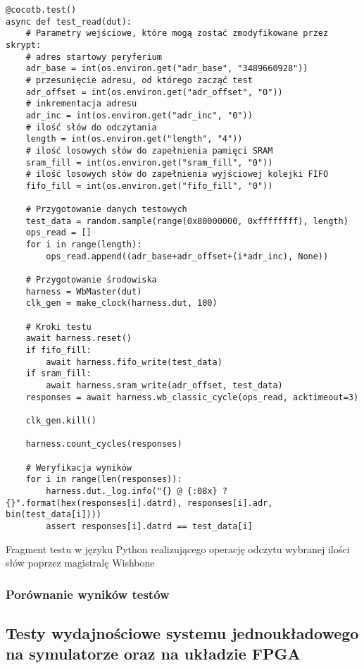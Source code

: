 \begin{longlisting}
\begin{verbatim}
@cocotb.test()
async def test_read(dut):
    # Parametry wejściowe, które mogą zostać zmodyfikowane przez skrypt:
    # adres startowy peryferium
    adr_base = int(os.environ.get("adr_base", "3489660928"))
    # przesunięcie adresu, od którego zacząć test
    adr_offset = int(os.environ.get("adr_offset", "0"))
    # inkrementacja adresu
    adr_inc = int(os.environ.get("adr_inc", "0"))
    # ilość słów do odczytania
    length = int(os.environ.get("length", "4"))
    # ilość losowych słów do zapełnienia pamięci SRAM
    sram_fill = int(os.environ.get("sram_fill", "0"))
    # ilość losowych słów do zapełnienia wyjściowej kolejki FIFO
    fifo_fill = int(os.environ.get("fifo_fill", "0"))

    # Przygotowanie danych testowych
    test_data = random.sample(range(0x80000000, 0xffffffff), length)
    ops_read = []
    for i in range(length):
        ops_read.append((adr_base+adr_offset+(i*adr_inc), None))

    # Przygotowanie środowiska
    harness = WbMaster(dut)
    clk_gen = make_clock(harness.dut, 100)

    # Kroki testu
    await harness.reset()
    if fifo_fill:
        await harness.fifo_write(test_data)
    if sram_fill:
        await harness.sram_write(adr_offset, test_data)
    responses = await harness.wb_classic_cycle(ops_read, acktimeout=3)

    clk_gen.kill()

    harness.count_cycles(responses)

    # Weryfikacja wyników
    for i in range(len(responses)):
        harness.dut._log.info("{} @ {:08x} ? {}".format(hex(responses[i].datrd), responses[i].adr, bin(test_data[i])))
        assert responses[i].datrd == test_data[i]
\end{verbatim}
\caption{\label{lst:harness-sampletest}Fragment testu w języku Python realizującego operację odczytu wybranej ilości słów poprzez magistralę Wishbone}
\end{longlisting}


\subsubsection{Porównanie wyników testów}


\subsection{Testy wydajnościowe systemu jednoukładowego na symulatorze oraz na układzie FPGA}

